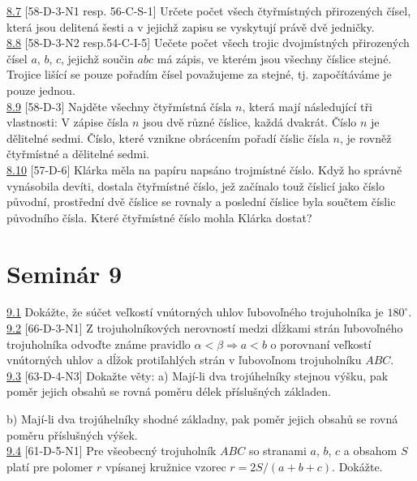 \noindent \ul{8.7} [58-D-3-N1 resp. 56-C-S-1] Určete počet všech čtyřmístných přirozených čísel,
která jsou delitená šesti a v jejichž zapisu se vyskytují právě dvě jedničky.\\

\noindent \ul{8.8} [58-D-3-N2 resp.54-C-I-5]  Uečete počet všech trojic dvojmístných přirozených
čísel $a$, $b$, $c$, jejichž součin $abc$ má zápis, ve kterém jsou všechny číslice stejné. Trojice
lišící se pouze pořadím čísel považujeme za stejné, tj. započítáváme je pouze jednou.\\

\noindent \ul{8.9} [58-D-3] Najděte všechny čtyřmístná čísla $n$, která mají následující tři
vlastnosti: V zápise čísla $n$ jsou dvě různé číslice, každá dvakrát. Číslo $n$ je dělitelné sedmi.
Číslo, které vznikne obrácením pořadí číslic čísla $n$, je rovněž čtyřmístné a dělitelné sedmi.\\

\noindent \ul{8.10} [57-D-6] Klárka měla na papíru napsáno trojmístné číslo. Když ho správně
vynásobila devíti, dostala čtyřmístné číslo, jež začínalo touž číslicí jako číslo původní,
prostřední dvě číslice se rovnaly a poslední číslice byla součtem číslic původního čísla. Které
čtyřmístné číslo mohla Klárka dostat?\\

\section*{Seminár 9}

\noindent \ul{9.1} Dokážte, že súčet veľkostí vnútorných uhlov ľubovoľného trojuholníka je $180^\circ$.\\

\noindent \ul{9.2} [66-D-3-N1] Z trojuholníkových nerovností medzi dĺžkami strán ľubovoľného trojuholníka odvoďte známe
pravidlo $\alpha < \beta \Rightarrow a < b$ o porovnaní veľkostí vnútorných uhlov a dĺžok protiľahlých strán v ľubovoľnom trojuholníku $ABC$.\\

\noindent \ul{9.3} [63-D-4-N3] Dokažte věty:
a) Mají-li dva trojúhelníky stejnou výšku, pak poměr jejich obsahů se rovná poměru délek příslušných základen.

b) Mají-li dva trojúhelníky shodné základny, pak poměr jejich obsahů se rovná poměru příslušných výšek.\\

\noindent \ul{9.4} [61-D-5-N1]  Pre všeobecný trojuholník $ABC$ so stranami $a$, $b$, $c$ a obsahom $S$ platí pre polomer $r$ vpísanej kružnice vzorec $r = 2S/(a + b + c)$. Dokážte.\\

